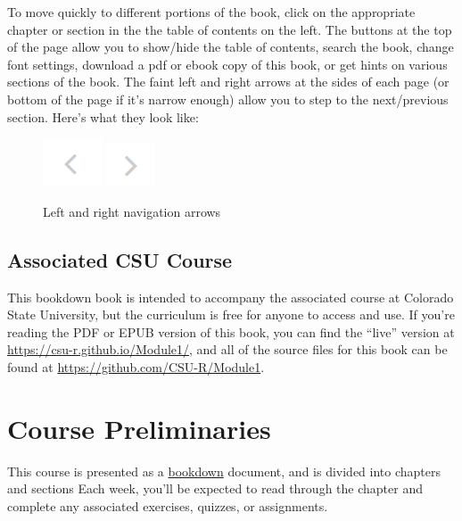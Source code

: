 \documentclass[
]{book}
\begin{document}
To move quickly to different portions of the book, click on the appropriate chapter or section in the the table of contents on the left.
The buttons at the top of the page allow you to show/hide the table of contents, search the book, change font settings, download a pdf or ebook copy of this book, or get hints on various sections of the book.
The faint left and right arrows at the sides of each page (or bottom of the page if it's narrow enough) allow you to step to the next/previous section.
Here's what they look like:

\begin{figure}

{\centering \includegraphics{src/images/left_arrow} \includegraphics{src/images/right_arrow} 

}

\caption{Left and right navigation arrows}\label{fig:unnamed-chunk-1}
\end{figure}

\hypertarget{associated-csu-course}{%
\section{Associated CSU Course}\label{associated-csu-course}}

This bookdown book is intended to accompany the associated course at Colorado State University, but the curriculum is free for anyone to access and use.
If you're reading the PDF or EPUB version of this book, you can find the ``live'' version at \url{https://csu-r.github.io/Module1/}, and all of the source files for this book can be found at \url{https://github.com/CSU-R/Module1}.

\hypertarget{prelim}{%
\chapter{Course Preliminaries}\label{prelim}}

This course is presented as a \href{https://bookdown.org/}{bookdown} document, and is divided into chapters and sections
Each week, you'll be expected to read through the chapter and complete any associated exercises, quizzes, or assignments.
\end{document}

